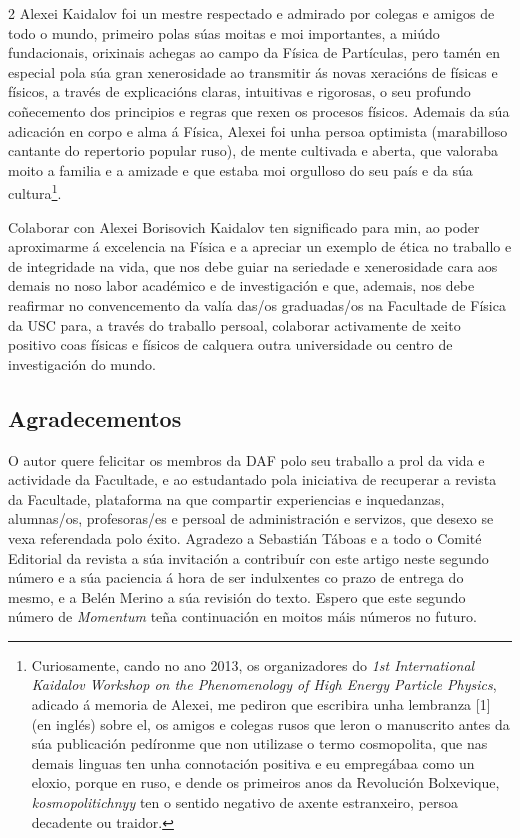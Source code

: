 \begin{multicols}{2}
Alexei Kaidalov foi un mestre respectado e admirado por colegas e amigos de
todo o mundo, primeiro polas súas moitas e moi importantes, a miúdo
fundacionais, orixinais achegas ao campo da Física de Partículas, pero tamén en
especial pola súa gran xenerosidade ao transmitir ás novas xeracións de físicas
e físicos, a través de explicacións claras, intuitivas e rigorosas, o seu
profundo coñecemento dos principios e regras que rexen os procesos físicos.
Ademais da súa adicación en corpo e alma á Física, Alexei foi unha persoa
optimista (marabilloso cantante do repertorio popular ruso), de mente cultivada
e aberta, que valoraba moito a familia e a amizade e que estaba moi orgulloso
do seu país e da súa cultura\footnote[1]{Curiosamente, cando no ano 2013, os
organizadores do \textit{1st International Kaidalov Workshop on the
Phenomenology of High Energy Particle Physics}, adicado á memoria de Alexei, me
pediron que escribira unha lembranza [1] (en inglés) sobre el, os amigos e
colegas rusos que leron o manuscrito antes da súa publicación pedíronme que non
utilizase o termo cosmopolita, que nas demais linguas ten unha connotación
positiva e eu empregábaa como un eloxio, porque en ruso, e dende os primeiros
anos da Revolución Bolxevique, \textit{kosmopolitichnyy} ten o sentido negativo
de axente estranxeiro, persoa decadente ou traidor.}.

Colaborar con Alexei Borisovich Kaidalov ten significado para min, ao poder
aproximarme á excelencia na Física e a apreciar un exemplo de ética no traballo
e de integridade na vida, que nos debe guiar na seriedade e xenerosidade cara
aos demais no noso labor académico e de investigación e que, ademais, nos debe
reafirmar no convencemento da valía das/os graduadas/os na Facultade de Física
da USC para, a través do traballo persoal, colaborar activamente de xeito
positivo coas físicas e físicos de calquera outra universidade ou centro de
investigación do mundo.

\subsection*{Agradecementos}

O autor quere felicitar os membros da DAF polo seu traballo a prol da vida e
actividade da Facultade, e ao estudantado pola iniciativa de recuperar a
revista da Facultade, plataforma na que compartir experiencias e inquedanzas,
alumnas/os, profesoras/es e persoal de administración e servizos, que desexo se
vexa referendada polo éxito. Agradezo a Sebastián Táboas e a todo o Comité
Editorial da revista a súa invitación a contribuír con este artigo neste
segundo número e a súa paciencia á hora de ser indulxentes co prazo de entrega
do mesmo, e a Belén Merino a súa revisión do texto. Espero que este segundo
número de \textit{Momentum} teña continuación en moitos máis números no futuro.

\nocite{Merino_2015}

\printbibliography

\end{multicols}
